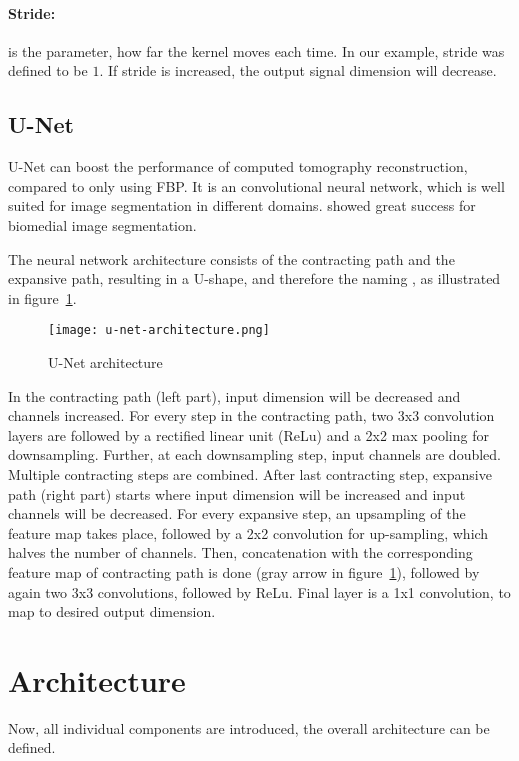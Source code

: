 \paragraph{Stride:}
is the parameter, how far the kernel moves each time. In our example, stride was defined to be $1$.
If stride is increased, the output signal dimension will decrease.


\subsection{U-Net}
U-Net can boost the performance of computed tomography reconstruction, compared to only using FBP.
It is an convolutional neural network, which is well suited for image segmentation in different domains.
\cite{unet-tomography} showed great success for biomedial image segmentation.

The neural network architecture consists of the contracting path and the expansive path,
resulting in a U-shape, and therefore the naming \cite{unet-tomography}, as illustrated in figure~\ref{fig:u-net-architectue}.

\begin{figure}[H]
  \centering
  \label{fig:u-net-architectue}
  \texttt{[image: u-net-architecture.png]}
  \caption{U-Net architecture \cite[p 2, Fig. 1]{unet-tomography}}
\end{figure}


In the contracting path (left part), input dimension will be decreased and channels increased.
For every step in the contracting path, two 3x3 convolution layers are followed by a rectified linear unit (ReLu)
and a 2x2 max pooling for downsampling. Further, at each downsampling step, input channels are doubled.
Multiple contracting steps are combined. After last contracting step, expansive path (right part) starts
where input dimension will be increased and input channels will be decreased.
For every expansive step, an upsampling of the feature map takes place, followed by a 2x2 convolution
for up-sampling, which halves the number of channels. Then, concatenation with the corresponding feature
map of contracting path is done (gray arrow in figure~\ref{fig:u-net-architectue}), followed by again two 3x3 convolutions, followed by ReLu.
Final layer is a 1x1 convolution, to map to desired output dimension.

\section{Architecture}
Now, all individual components are introduced, the overall architecture can be defined.


